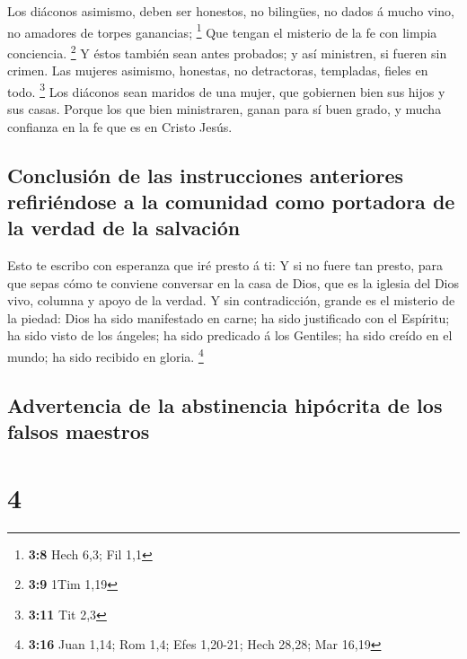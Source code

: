  Los diáconos asimismo, deben ser honestos, no bilingües,
no dados á mucho vino, no amadores de torpes ganancias; \footnote{\textbf{3:8}
  Hech 6,3; Fil 1,1}  Que tengan el misterio de la fe con
limpia conciencia. \footnote{\textbf{3:9} 1Tim 1,19}  Y
éstos también sean antes probados; y así ministren, si fueren sin
crimen.  Las mujeres asimismo, honestas, no detractoras,
templadas, fieles en todo. \footnote{\textbf{3:11} Tit 2,3}
 Los diáconos sean maridos de una mujer, que gobiernen
bien sus hijos y sus casas.  Porque los que bien
ministraren, ganan para sí buen grado, y mucha confianza en la fe que es
en Cristo Jesús.

\hypertarget{conclusiuxf3n-de-las-instrucciones-anteriores-refiriuxe9ndose-a-la-comunidad-como-portadora-de-la-verdad-de-la-salvaciuxf3n}{%
\subsection{Conclusión de las instrucciones anteriores refiriéndose a la
comunidad como portadora de la verdad de la
salvación}\label{conclusiuxf3n-de-las-instrucciones-anteriores-refiriuxe9ndose-a-la-comunidad-como-portadora-de-la-verdad-de-la-salvaciuxf3n}}

 Esto te escribo con esperanza que iré presto á ti:
 Y si no fuere tan presto, para que sepas cómo te
conviene conversar en la casa de Dios, que es la iglesia del Dios vivo,
columna y apoyo de la verdad.  Y sin contradicción,
grande es el misterio de la piedad: Dios ha sido manifestado en carne;
ha sido justificado con el Espíritu; ha sido visto de los ángeles; ha
sido predicado á los Gentiles; ha sido creído en el mundo; ha sido
recibido en gloria. \footnote{\textbf{3:16} Juan 1,14; Rom 1,4; Efes
  1,20-21; Hech 28,28; Mar 16,19}

\hypertarget{advertencia-de-la-abstinencia-hipuxf3crita-de-los-falsos-maestros}{%
\subsection{Advertencia de la abstinencia hipócrita de los falsos
maestros}\label{advertencia-de-la-abstinencia-hipuxf3crita-de-los-falsos-maestros}}

\hypertarget{section-3}{%
\section{4}\label{section-3}}

